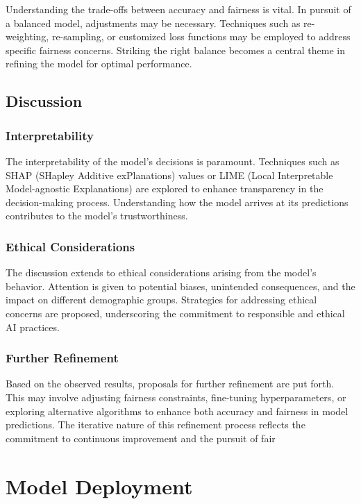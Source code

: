 Understanding the trade-offs between accuracy and fairness is vital. In pursuit of a balanced model, adjustments may be necessary. Techniques such as re-weighting, re-sampling, or customized loss functions may be employed to address specific fairness concerns. Striking the right balance becomes a central theme in refining the model for optimal performance.

\subsection{Discussion}

\subsubsection{Interpretability}

The interpretability of the model's decisions is paramount. Techniques such as SHAP (SHapley Additive exPlanations) values or LIME (Local Interpretable Model-agnostic Explanations) are explored to enhance transparency in the decision-making process. Understanding how the model arrives at its predictions contributes to the model's trustworthiness.

\subsubsection{Ethical Considerations}

The discussion extends to ethical considerations arising from the model's behavior. Attention is given to potential biases, unintended consequences, and the impact on different demographic groups. Strategies for addressing ethical concerns are proposed, underscoring the commitment to responsible and ethical AI practices.

\subsubsection{Further Refinement}

Based on the observed results, proposals for further refinement are put forth. This may involve adjusting fairness constraints, fine-tuning hyperparameters, or exploring alternative algorithms to enhance both accuracy and fairness in model predictions. The iterative nature of this refinement process reflects the commitment to continuous improvement and the pursuit of fair

\section{Model Deployment}
\label{section:model-deployment}

